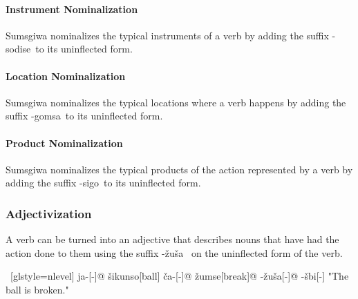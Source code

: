 \paragraph{Instrument Nominalization}
Sumsgiwa nominalizes the typical instruments of a verb by adding the suffix -\textlangle sodise\textrangle~to its uninflected form.

\paragraph{Location Nominalization}
Sumsgiwa nominalizes the typical locations where a verb happens by adding the suffix -\textlangle gomsa\textrangle~to its uninflected form.

\paragraph{Product Nominalization}
Sumsgiwa nominalizes the typical products of the action represented by a verb by adding the suffix -\textlangle sigo\textrangle~to its uninflected form.

\subsubsection{Adjectivization}
A verb can be turned into an adjective that describes nouns that have had the action done to them using the suffix -\textlangle \v{z}u\v{s}a\textrangle~ on the uninflected form of the verb.

\ex~[glstyle=nlevel]
\begingl
\glpreamble {}
\endpreamble
ja-[{\Nom}-]@
\v{s}ikunso[ball]
\v{c}a-[{\Nom}-]@
\v{z}umse[break]@
-\v{z}u\v{s}a[-{\Adjz}]@
-\v{s}bi[-{\Inan}]
\glft "The ball is broken."
\endgl
\xe
